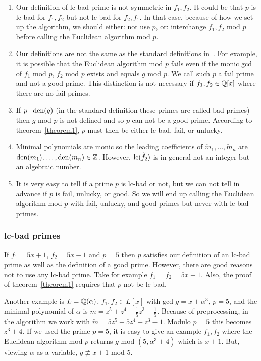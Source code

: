 \documentclass[10pt]{article}
\newcommand{\Q}{\QQ}
\newcommand{\bad}{lc-bad }
\newcommand{\bbad}{lc-bad}
\begin{document}
\begin{enumerate}
\item Our definition of \bad prime is not symmetric in $f_1,f_2$.
It could be that $p$ is \bad for $f_1,f_2$ but not \bad for $f_2,f_1$.
In that case, because of how we set up the algorithm,
we should either: not use $p$, or: interchange
$f_1,f_2$ mod $p$ before calling the Euclidean algorithm mod $p$.


\item Our definitions are not the same as the
standard definitions in~\cite{Brown}.
For example, it is possible that the Euclidean algorithm mod $p$ fails
even if the monic gcd of $f_1$ mod $p$, $f_2$ mod $p$ exists
and equals $g$ mod $p$.
We call such $p$ a fail prime and not a good prime.
This distinction is not necessary if $f_1,f_2 \in \Q[x]$
where there are no fail primes.



\item If $p \mid {\rm den}(g)$
(in the standard definition these primes are called bad primes)
then $g$ mod $p$ is not defined and so
$p$ can not be a good prime.
According to theorem~\ref{theorem1}, $p$ must then be either
\bbad, fail, or unlucky.



\item Minimal polynomials are monic so
the leading coefficients of $\check{m}_1, \ldots, \check{m}_n$ are
${\rm den}(m_1), \ldots, {\rm den}(m_n) \in {\mathbb Z}$.
However, ${\rm lc}(\check{f_2})$ is in general not an integer but
an algebraic number.


\item 
It is very easy to tell if a prime $p$ is \bad or not, but we can
not tell in advance if $p$ is fail, unlucky, or good.
So we will end up calling the Euclidean algorithm mod $p$ with fail, unlucky,
and good primes but never with \bad primes.
\end{enumerate}

\subsubsection{\bad primes}
If $f_1=5x+1$, $f_2=5x-1$ and $p=5$ then $p$ satisfies
our definition of an \bad prime as well as the definition of a good
prime. However, there are good reasons not to use any \bad prime.
Take for example $f_1=f_2=5x+1$.
Also, the proof of theorem~\ref{theorem1}
requires that $p$ not be \bbad.


Another example is $L=\Q(\alpha)$, $f_1,f_2 \in L[x]$ with
gcd $g = x + \alpha^3$,
$p=5$, and the minimal polynomial of $\alpha$ is
$m=z^5+z^4+\frac15 z^3 - \frac15$.
Because of preprocessing, in the algorithm we work with
$\check{m} = 5 z^5 + 5z^4+ z^3 - 1$. Modulo $p=5$ this becomes
$z^3 + 4$. If we used the prime $p=5$, it is easy to give an example $f_1,f_2$
where the Euclidean algorithm mod $p$ returns $g$ mod $(5,\alpha^3 + 4)$
which is $x+1$. But, viewing $\alpha$ as a variable,
$g \not\equiv x+1$ mod $5$.
\end{document}
